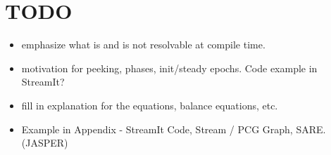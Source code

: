 \section*{TODO}

\begin{itemize}

\item emphasize what is and is not resolvable at compile time.

\item motivation for peeking, phases, init/steady epochs.  Code
example in StreamIt?

\item fill in explanation for the equations, balance equations, etc.

\item Example in Appendix - StreamIt Code, Stream / PCG Graph, SARE. (JASPER)

\end{itemize}

